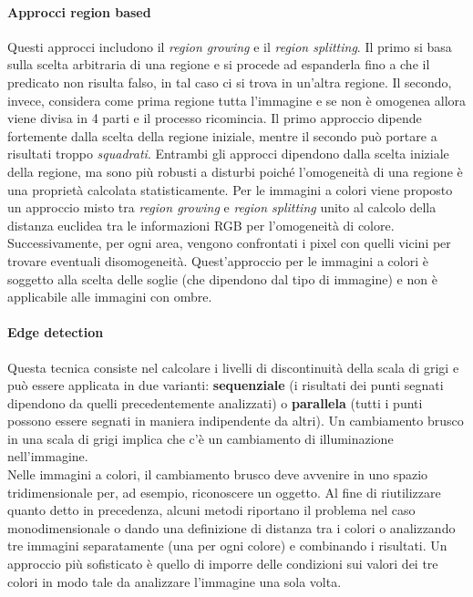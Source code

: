 \paragraph{Approcci region based} Questi approcci includono il \textit{region growing} e il \textit{region splitting}. Il primo si basa sulla scelta arbitraria di una regione e si procede ad espanderla fino a che il predicato non risulta falso, in tal caso ci si trova in un'altra regione. Il secondo, invece, considera come prima regione tutta l'immagine e se non è omogenea allora viene divisa in 4 parti e il processo ricomincia. Il primo approccio dipende fortemente dalla scelta della regione iniziale, mentre il secondo può portare a risultati troppo \textit{squadrati}. Entrambi gli approcci dipendono dalla scelta iniziale della regione, ma sono più robusti a disturbi poiché l'omogeneità di una regione è una proprietà calcolata statisticamente. Per le immagini a colori viene proposto un approccio misto tra \textit{region growing} e \textit{region splitting} unito al calcolo della distanza euclidea \cite{wiki:euclidean} tra le informazioni RGB per l'omogeneità di colore. Successivamente, per ogni area, vengono confrontati i pixel con quelli vicini per trovare eventuali disomogeneità. Quest'approccio per le immagini a colori è soggetto alla scelta delle soglie (che dipendono dal tipo di immagine) e non è applicabile alle immagini con ombre.

\paragraph{Edge detection} Questa tecnica consiste nel calcolare i livelli di discontinuità della scala di grigi e può essere applicata in due varianti: \textbf{sequenziale} (i risultati dei punti segnati dipendono da quelli precedentemente analizzati) o \textbf{parallela} (tutti i punti possono essere segnati in maniera indipendente da altri). Un cambiamento brusco in una scala di grigi implica che c'è un cambiamento di illuminazione nell'immagine.\\
Nelle immagini a colori, il cambiamento brusco deve avvenire in uno spazio tridimensionale per, ad esempio, riconoscere un oggetto. Al fine di riutilizzare quanto detto in precedenza, alcuni metodi riportano il problema nel caso monodimensionale o dando una definizione di distanza tra i colori o analizzando tre immagini separatamente (una per ogni colore) e combinando i risultati. Un approccio più sofisticato è quello di imporre delle condizioni sui valori dei tre colori in modo tale da analizzare l'immagine una sola volta.

